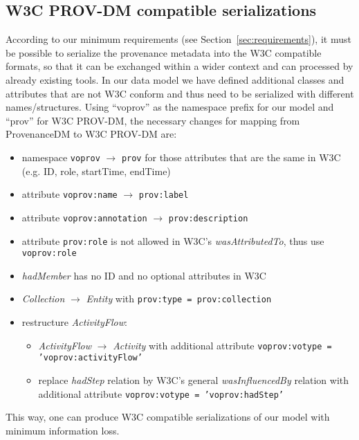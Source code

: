 \subsection{W3C PROV-DM compatible serializations}
According to our minimum requirements (see Section~\ref{sec:requirements}), it must be possible to
serialize the provenance metadata into the W3C compatible formats, so that it can be exchanged within a wider context and can processed by already existing tools.
In our data model we have defined additional classes and attributes that are not W3C conform and thus need to be
serialized with different names/structures. Using ``voprov'' as the namespace prefix for our model and ``prov'' for W3C PROV-DM, the necessary changes for mapping from ProvenanceDM to W3C PROV-DM are:

\begin{itemize}
\item namespace \texttt{voprov} $\rightarrow$ \texttt{prov} for those attributes that are the same in W3C (e.g. ID, role, startTime, endTime)
\item attribute \texttt{voprov:name} $\rightarrow$ \texttt{prov:label}
\item attribute \texttt{voprov:annotation} $\rightarrow$ \texttt{prov:description}
\item attribute \texttt{prov:role} is not allowed in W3C's \emph{wasAttributedTo}, thus use \texttt{voprov:role}
\item \emph{hadMember} has no ID and no optional attributes in W3C
\item \emph{Collection} $\rightarrow$ \emph{Entity} with \texttt{prov:type = prov:collection}
\item restructure \emph{ActivityFlow}:
	\begin{itemize}
	\item \emph{ActivityFlow} $\rightarrow$ \emph{Activity} with additional attribute \texttt{voprov:votype = 'voprov:activityFlow'}
	\item replace \emph{hadStep} relation by W3C's general \emph{wasInfluencedBy} relation with additional attribute \texttt{voprov:votype = 'voprov:hadStep'}
	\end{itemize}

\end{itemize}

This way, one can produce W3C compatible serializations of our model with minimum information loss.
